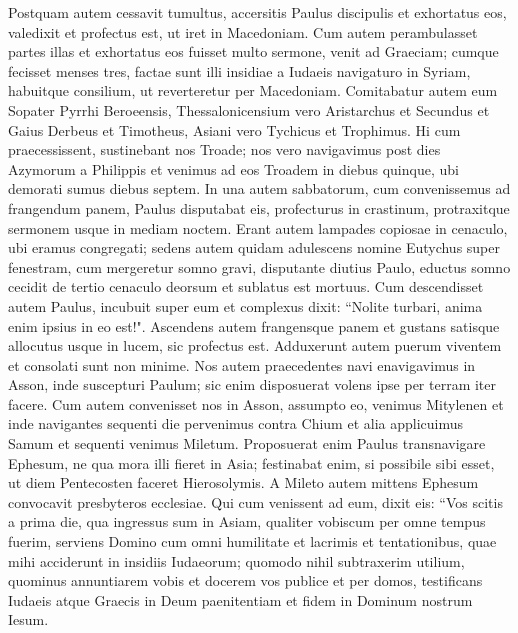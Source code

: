 \begin{biblechapter}  
\verse Postquam autem cessavit tumultus, accersitis Paulus discipulis et exhortatus eos, valedixit et profectus est, ut iret in Macedoniam. 
\verse Cum autem perambulasset partes illas et exhortatus eos fuisset multo sermone, venit ad Graeciam; 
\verse cumque fecisset menses tres, factae sunt illi insidiae a Iudaeis navigaturo in Syriam, habuitque consilium, ut reverteretur per Macedoniam. 
\verse Comitabatur autem eum Sopater Pyrrhi Beroeensis, Thessalonicensium vero Aristarchus et Secundus et Gaius Derbeus et Timotheus, Asiani vero Tychicus et Trophimus. 
\verse Hi cum praecessissent, sustinebant nos Troade; 
\verse nos vero navigavimus post dies Azymorum a Philippis et venimus ad eos Troadem in diebus quinque, ubi demorati sumus diebus septem. 
\verse In una autem sabbatorum, cum convenissemus ad frangendum panem, Paulus disputabat eis, profecturus in crastinum, protraxitque sermonem usque in mediam noctem. 
\verse Erant autem lampades copiosae in cenaculo, ubi eramus congregati;  
\verse sedens autem quidam adulescens nomine Eutychus super fenestram, cum mergeretur somno gravi, disputante diutius Paulo, eductus somno cecidit de tertio cenaculo deorsum et sublatus est mortuus. 
\verse Cum descendisset autem Paulus, incubuit super eum et complexus dixit: “Nolite turbari, anima enim ipsius in eo est!".  
\verse Ascendens autem frangensque panem et gustans satisque allocutus usque in lucem, sic profectus est. 
\verse Adduxerunt autem puerum viventem et consolati sunt non minime. 
\verse Nos autem praecedentes navi enavigavimus in Asson, inde suscepturi Paulum; sic enim disposuerat volens ipse per terram iter facere. 
\verse Cum autem convenisset nos in Asson, assumpto eo, venimus Mitylenen 
\verse et inde navigantes sequenti die pervenimus contra Chium et alia applicuimus Samum et sequenti venimus Miletum. 
\verse Proposuerat enim Paulus transnavigare Ephesum, ne qua mora illi fieret in Asia; festinabat enim, si possibile sibi esset, ut diem Pentecosten faceret Hierosolymis. 
\verse A Mileto autem mittens Ephesum convocavit presbyteros ecclesiae. 
\verse Qui cum venissent ad eum, dixit eis: “Vos scitis a prima die, qua ingressus sum in Asiam, qualiter vobiscum per omne tempus fuerim, 
\verse serviens Domino cum omni humilitate et lacrimis et tentationibus, quae mihi acciderunt in insidiis Iudaeorum; 
\verse quomodo nihil subtraxerim utilium, quominus annuntiarem vobis et docerem vos publice et per domos, 
\verse testificans Iudaeis atque Graecis in Deum paenitentiam et fidem in Dominum nostrum Iesum. 

\end{biblechapter}

